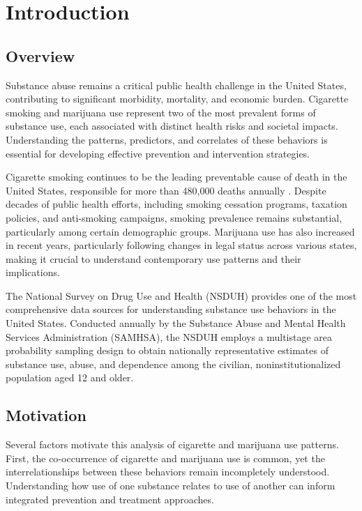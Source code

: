 \documentclass[conference]{IEEEtran}
\begin{document}
\section{Introduction}

\subsection{Overview}

Substance abuse remains a critical public health challenge in the United States, contributing to significant morbidity, mortality, and economic burden. Cigarette smoking and marijuana use represent two of the most prevalent forms of substance use, each associated with distinct health risks and societal impacts. Understanding the patterns, predictors, and correlates of these behaviors is essential for developing effective prevention and intervention strategies.

Cigarette smoking continues to be the leading preventable cause of death in the United States, responsible for more than 480,000 deaths annually \cite{cdc2014}. Despite decades of public health efforts, including smoking cessation programs, taxation policies, and anti-smoking campaigns, smoking prevalence remains substantial, particularly among certain demographic groups. Marijuana use has also increased in recent years, particularly following changes in legal status across various states, making it crucial to understand contemporary use patterns and their implications.

The National Survey on Drug Use and Health (NSDUH) provides one of the most comprehensive data sources for understanding substance use behaviors in the United States. Conducted annually by the Substance Abuse and Mental Health Services Administration (SAMHSA), the NSDUH employs a multistage area probability sampling design to obtain nationally representative estimates of substance use, abuse, and dependence among the civilian, noninstitutionalized population aged 12 and older.

\subsection{Motivation}

Several factors motivate this analysis of cigarette and marijuana use patterns. First, the co-occurrence of cigarette and marijuana use is common, yet the interrelationships between these behaviors remain incompletely understood. Understanding how use of one substance relates to use of another can inform integrated prevention and treatment approaches.
\end{document}
